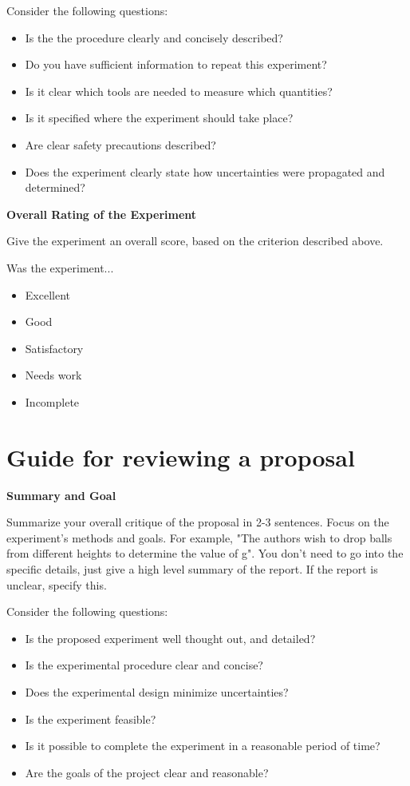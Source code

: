Consider the following questions:
\begin{itemize}
\item Is the the procedure clearly and concisely described? 
\item Do you have sufficient information to repeat this experiment?
\item Is it clear which tools are needed to measure which quantities?
\item Is it specified where the experiment should take place?
\item Are clear safety precautions described?
\item Does the experiment clearly state how uncertainties were propagated and determined?
\end{itemize}

\textbf{Overall Rating of the Experiment}

Give the experiment an overall score, based on the criterion described above.

Was the experiment...
\begin{itemize}
\item Excellent
\item Good
\item Satisfactory
\item Needs work
\item Incomplete
\end{itemize}

\newpage
\section{Guide for reviewing a proposal}
 \vspace{0.25cm}
\textbf{Summary and Goal}

Summarize your overall critique of the proposal in 2-3 sentences. Focus on the experiment's methods and goals. For example, "The authors wish to drop balls from different heights to determine the value of g". You don't need to go into the specific details, just give a high level summary of the report. If the report is unclear, specify this.

Consider the following questions:
\begin{itemize}
\item Is the proposed experiment well thought out, and detailed?
\item Is the experimental procedure clear and concise?
\item Does the experimental design minimize uncertainties?
\item Is the experiment feasible? 
\item Is it possible to complete the experiment in a reasonable period of time?
\item Are the goals of the project clear and reasonable?
\end{itemize}

